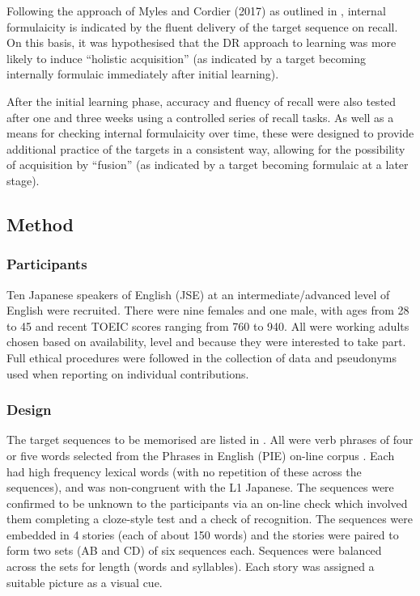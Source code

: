 \documentclass[output=paper]{langscibook}
\begin{document}
Following the approach of Myles and Cordier (2017) as outlined in , internal formulaicity is indicated by the fluent delivery of the target sequence on recall. On this basis, it was hypothesised that the DR approach to learning was more likely to induce  ``holistic acquisition'' (as indicated by a target becoming internally formulaic immediately after initial learning).

After the initial learning phase, accuracy and fluency of recall were also tested after one and three weeks using a controlled series of recall tasks. As well as a means for checking internal formulaicity over time, these were designed to provide additional practice of the targets in a consistent way, allowing for the possibility of acquisition by ``fusion'' (as indicated by a target becoming formulaic at a later stage). 

\subsection{Method}
\subsubsection{Participants}

Ten Japanese speakers of English (JSE) at an intermediate/advanced level of English were recruited. There were nine females and one male, with ages from 28 to 45 and recent TOEIC scores \citep{ETS2019} ranging from 760 to 940. All were working adults chosen based on availability, level and because they were interested to take part. Full ethical procedures were followed in the collection of data and pseudonyms used when reporting on individual contributions. 

\subsubsection{Design}

The target sequences to be memorised are listed in . All were verb phrases of four or five words selected from the Phrases in English (PIE) on-line corpus \citep{Fletcher2011}. Each had high frequency lexical words (with no repetition of these across the sequences), and was non-congruent with the L1 Japanese. The sequences were confirmed to be unknown to the participants via an on-line check which involved them completing a cloze-style test and a check of recognition. The sequences were embedded in 4 stories (each of about 150 words) and the stories were paired to form two sets (AB and CD) of six sequences each. Sequences were balanced across the sets for length (words and syllables). Each story was assigned a suitable picture as a visual cue.
\end{document}
